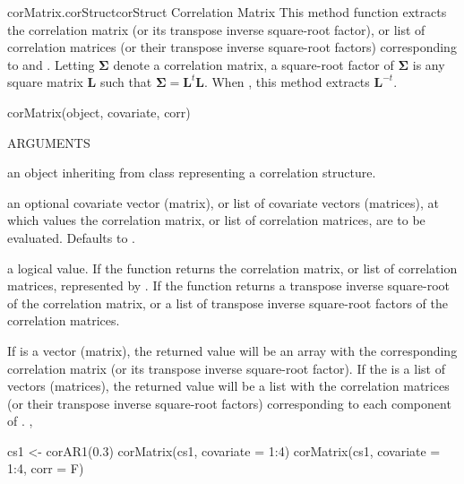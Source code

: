 \documentclass[pdftex]{article} \usepackage{url,graphicx}
\newcommand{\bm}[1]{{\boldsymbol {#1}}}
\newcommand{\bS}{\bm\Sigma}
\newcommand{\bL}{{\bm L}}
\begin{document}
\begin{Helpfile}{corMatrix.corStruct}{corStruct Correlation Matrix}
  This method function extracts the correlation matrix (or its
  transpose inverse square-root factor), or list of correlation
  matrices (or their transpose inverse square-root factors)
  corresponding to  and . Letting $\bS$
  denote a correlation matrix, a square-root factor of $\bS$ is any
  square matrix $\bL$ such that $\bS = \bL^t\bL$.  When , this method extracts $\bL^{-t}$.
\begin{Example}
corMatrix(object, covariate, corr)
\end{Example}
\begin{Argument}{ARGUMENTS}
\item[\Co{object:}]
an object inheriting from class 
representing a correlation structure.
\item[\Co{covariate:}]
an optional covariate vector (matrix), or list of
covariate vectors (matrices), at which values the correlation matrix,
or list of correlation  matrices, are to be evaluated. Defaults to
.
\item[\Co{corr:}]
a logical value. If  the function returns the
correlation matrix, or list of correlation matrices, represented by
. If  the function returns a transpose
inverse square-root of the correlation matrix, or a list of transpose
inverse square-root factors of the correlation matrices.
\end{Argument}
If  is a vector (matrix), the returned value will be
an array with the corresponding correlation matrix (or its transpose
inverse square-root factor). If the  is a list of
vectors (matrices), the returned value will be a list with the
correlation matrices (or their transpose inverse square-root factors)
corresponding to each component of .
, 
\need 15pt
\vspace{-16pt} 
\begin{Example}
cs1 <- corAR1(0.3)
corMatrix(cs1, covariate = 1:4)
corMatrix(cs1, covariate = 1:4, corr = F)
\end{Example}
\end{Helpfile}
\end{document}
